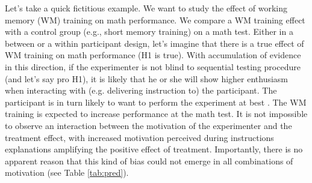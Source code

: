 \documentclass[a4paper,man,natbib,floatsintext,donotrepeattitle]{apa6}
\begin{document}
Let's take a quick fictitious example. We want to study the effect of working memory (WM) training on math performance. We compare a WM training effect with a control group (e.g., short memory training) on a math test. Either in a between or a within participant design, let's imagine that there is a true effect of WM training on math performance (H1 is true). With accumulation of evidence in this direction, if the experimenter is not blind to sequential testing procedure (and let's say pro H1), it is likely that he or she will show higher enthusiasm when interacting with (e.g. delivering instruction to) the participant. The participant is in turn likely to want to perform the experiment at best \citep{zoble_interaction_1969}. The WM training is expected to increase performance at the math test. It is not impossible to observe an interaction between the motivation of the experimenter and the treatment effect, with increased motivation perceived during instructions explanations amplifying the positive effect of treatment. Importantly, there is no apparent reason that this kind of bias could not emerge in all combinations of motivation (see Table \ref{tab:pred}). \par



\vspace{5mm}
\end{document}
